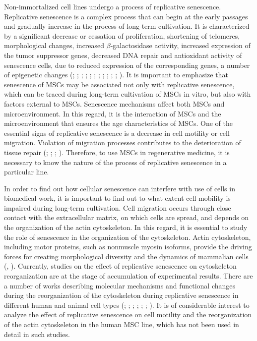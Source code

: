 \documentclass[alpha-refs]{wiley-article}
\begin{document}
Non-immortalized cell lines undergo a process of replicative senescence.
Replicative senescence is a complex process that can begin at the early passages and gradually increase in the process of long-term cultivation.
It is characterized by a significant decrease or cessation of proliferation, shortening of telomeres, morphological changes, increased $\beta$-galactosidase activity, increased expression of the tumor suppressor genes, decreased DNA repair and antioxidant activity of senescence cells, due to reduced expression of the corresponding genes, a number of epigenetic changes (\cite{wagner2008replicative}; \cite{kuilman2010essence}; \cite{redaelli2012cytogenomic}; \cite{estrada2013human}; \cite{savickiene2016senescence}; \cite{danisovic2017effect}; \cite{koltsova2018dynamics}; \cite{alessio2018mesenchymal}; \cite{krylova2018isolation}; \cite{niedernhofer2018nuclear}; \cite{truong2018characterization}; \cite{yu2018replicative}).
It is important to emphasize that senescence of MSCs may be associated not only with replicative senescence, which can be traced during long-term cultivation of MSCs in vitro, but also with factors external to MSCs.
Senescence mechanisms affect both MSCs and microenvironment.
In this regard, it is the interaction of MSCs and the microenvironment that ensures the age characteristics of MSCs.
One of the essential signs of replicative senescence is a decrease in cell motility or cell migration.
Violation of migration processes contributes to the deterioration of tissue repair (\cite{geissler2012functional}; \cite{bertolo2015vitro}; \cite{turinetto2016senescence}; \cite{zhang2018overexpression}).
Therefore, to use MSCs in regenerative medicine, it is necessary to know the nature of the process of replicative senescence in a particular line.

In order to find out how cellular senescence can interfere with use of cells in biomedical work, it is important to find out to what extent cell mobility is impaired during long-term cultivation.
Cell migration occurs through close contact with the extracellular matrix, on which cells are spread, and depends on the organization of the actin cytoskeleton.
In this regard, it is essential to study the role of senescence in the organization of the cytoskeleton.
Actin cytoskeleton, including motor proteins, such as nonmuscle myosin isoforms, provide the driving forces for creating morphological diversity and the dynamics of mammalian cells (\cite{vasiliev1991polarization}, \cite{omelchenko2002mechanisms}).
Currently, studies on the effect of replicative senescence on cytoskeleton reorganization are at the stage of accumulation of experimental results.
There are a number of works describing molecular mechanisms and functional changes during the reorganization of the cytoskeleton during replicative senescence in different human and animal cell types (\cite{larsen2003phosphatases}; \cite{le2008regulation}; \cite{wang2009protein}; \cite{geissler2012functional}; \cite{ozcan2016unbiased}; \cite{turinetto2016senescence}; \cite{moujaber2019cellular}).
It is of considerable interest to analyze the effect of replicative senescence on cell motility and the reorganization of the actin cytoskeleton in the human MSC line, which has not been used in detail in such studies.
\end{document}
